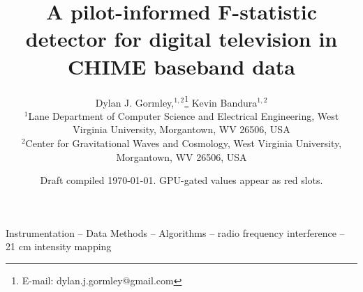 \documentclass[fleqn,usenatbib]{mnras}
\title[A pilot-informed F-statistic DTV detector for CHIME]{A
pilot-informed F-statistic detector for digital television in CHIME
baseband data}
\author[D. J. Gormley and K. Bandura]{Dylan J. Gormley,$^{1,2}$\thanks{E-mail:
dylan.j.gormley@gmail.com}
Kevin Bandura$^{1,2}$
\\
$^{1}$Lane Department of Computer Science and Electrical Engineering,
West Virginia University, Morgantown, WV 26506, USA\\
$^{2}$Center for Gravitational Waves and Cosmology, West Virginia
University, Morgantown, WV 26506, USA
}
\date{Draft compiled \today. GPU-gated values appear as red slots.}
\begin{document}
\label{firstpage}
\maketitle

\begin{abstract}

\end{abstract}

\begin{keywords}
Instrumentation -- Data Methods -- Algorithms -- radio frequency
interference -- 21 cm intensity mapping
\end{keywords}






\appendix


\label{lastpage}
\end{document}
